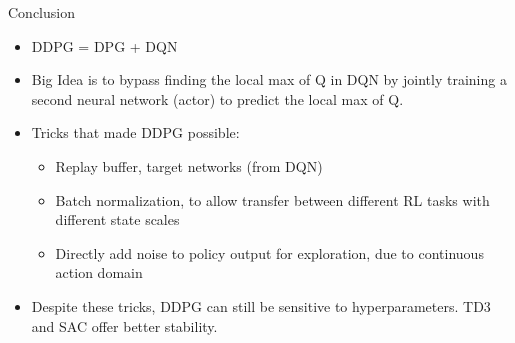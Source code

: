 \begin{frame}{Conclusion}
\begin{itemize}
    \item DDPG = DPG + DQN
    \item Big Idea is to bypass finding the local max of Q in DQN by jointly training a second neural network (actor) to predict the local max of Q.
    \vspace{0.3em}
    \item Tricks that made DDPG possible:
    \begin{itemize}
        \item Replay buffer, target networks (from DQN)
        \item Batch normalization, to allow transfer between different RL tasks with different state scales
        \item Directly add noise to policy output for exploration, due to continuous action domain
    \end{itemize}
    \item Despite these tricks, DDPG can still be sensitive to hyperparameters. TD3 and SAC offer better stability.
\end{itemize}
\end{frame}
